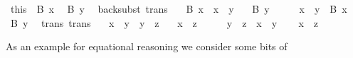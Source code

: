 \begin{isabellebody}
\ this\ \ {\isacharbackquoteopen}B\ x{\isacharbackquoteclose}\ \isamarkupfalse%
\ {\isachardoublequoteopen}B\ y{\isachardoublequoteclose}\ \isacommand{{\isachardot}{\isachardot}}\isamarkupfalse%
\isanewline
{}\isamarkupfalse%
%
\endisatagproof
{\isafoldproof}%
%
\isadelimproof
\isanewline
%
\endisadelimproof
\isanewline
{}\isamarkupfalse%
\ back{\isacharunderscore}subst\ {\isacharbrackleft}trans{\isacharbrackright}{\isacharcolon}\isanewline
\ \ \ {\isachardoublequoteopen}B\ x{\isachardoublequoteclose}\ \ {\isachardoublequoteopen}x\ {\isacharequal}\ y{\isachardoublequoteclose}\isanewline
\ \ \ {\isachardoublequoteopen}B\ y{\isachardoublequoteclose}\isanewline
%
\isadelimproof
%
\endisadelimproof
%
\isatagproof
{}\isamarkupfalse%
\ {\isacharminus}\isanewline
\ \ \isamarkupfalse%
\ {\isacharbackquoteopen}x\ {\isacharequal}\ y{\isacharbackquoteclose}\ \ {\isacharbackquoteopen}B\ x{\isacharbackquoteclose}\isanewline
\ \ \isamarkupfalse%
\ {\isachardoublequoteopen}B\ y{\isachardoublequoteclose}\ \isacommand{{\isachardot}{\isachardot}}\isamarkupfalse%
\isanewline
{}\isamarkupfalse%
%
\endisatagproof
{\isafoldproof}%
%
\isadelimproof
\isanewline
%
\endisadelimproof
\isanewline
{}\isamarkupfalse%
\ trans\ {\isacharbrackleft}trans{\isacharbrackright}{\isacharcolon}\isanewline
\ \ \ {\isachardoublequoteopen}x\ {\isacharequal}\ y{\isachardoublequoteclose}\ \ {\isachardoublequoteopen}y\ {\isacharequal}\ z{\isachardoublequoteclose}\isanewline
\ \ \ {\isachardoublequoteopen}x\ {\isacharequal}\ z{\isachardoublequoteclose}\isanewline
%
\isadelimproof
%
\endisadelimproof
%
\isatagproof
{}\isamarkupfalse%
\ {\isacharminus}\isanewline
\ \ \isamarkupfalse%
\ {\isacharbackquoteopen}y\ {\isacharequal}\ z{\isacharbackquoteclose}\ \ {\isacharbackquoteopen}x\ {\isacharequal}\ y{\isacharbackquoteclose}\isanewline
\ \ \isamarkupfalse%
\ {\isachardoublequoteopen}x\ {\isacharequal}\ z{\isachardoublequoteclose}\ \isacommand{{\isachardot}{\isachardot}}\isamarkupfalse%
\isanewline
{}\isamarkupfalse%
%
\endisatagproof
{\isafoldproof}%
%
\isadelimproof
%
\endisadelimproof
%
\isamarkuptrue%
%
\begin{isamarkuptext}%
As an example for equational reasoning we consider some bits of

\end{isamarkuptext}
\end{isabellebody}
